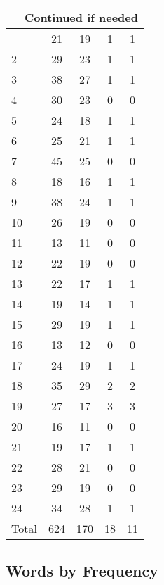 \begin{center}
\begin{longtable}{l|c|c|c|c}
\hline \multicolumn{5}{|r|}{{Continued if needed}} \\ \hline
\endfoot 
1 & 21 & 19 & 1 & 1\\ \hline
2 & 29 & 23 & 1 & 1\\ \hline
3 & 38 & 27 & 1 & 1\\ \hline
4 & 30 & 23 & 0 & 0\\ \hline
5 & 24 & 18 & 1 & 1\\ \hline
6 & 25 & 21 & 1 & 1\\ \hline
7 & 45 & 25 & 0 & 0\\ \hline
8 & 18 & 16 & 1 & 1\\ \hline
9 & 38 & 24 & 1 & 1\\ \hline
10 & 26 & 19 & 0 & 0\\ \hline
11 & 13 & 11 & 0 & 0\\ \hline
12 & 22 & 19 & 0 & 0\\ \hline
13 & 22 & 17 & 1 & 1\\ \hline
14 & 19 & 14 & 1 & 1\\ \hline
15 & 29 & 19 & 1 & 1\\ \hline
16 & 13 & 12 & 0 & 0\\ \hline
17 & 24 & 19 & 1 & 1\\ \hline
18 & 35 & 29 & 2 & 2\\ \hline
19 & 27 & 17 & 3 & 3\\ \hline
20 & 16 & 11 & 0 & 0\\ \hline
21 & 19 & 17 & 1 & 1\\ \hline
22 & 28 & 21 & 0 & 0\\ \hline
23 & 29 & 19 & 0 & 0\\ \hline
24 & 34 & 28 & 1 & 1\\ \hline
\hline \hline
Total & 624 & 170 & 18 & 11



\end{longtable}
\end{center}

 
\subsection{Words by Frequency}

